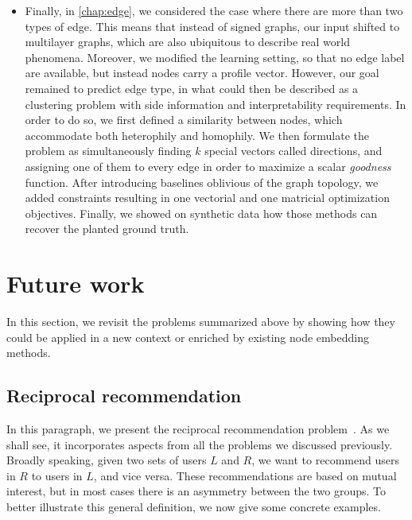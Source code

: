 \begin{itemize}
  \item Finally, in \autoref{chap:edge}, we considered the case where there are more than two types
    of edge. This means that instead of signed graphs, our input shifted to multilayer graphs, which
    are also ubiquitous to describe real world phenomena. Moreover, we modified the learning
    setting, so that no edge label are available, but instead nodes carry a profile vector. However,
    our goal remained to predict edge type, in what could then be described as a clustering problem
    with side information and interpretability requirements. In order to do so, we first defined a
    similarity between nodes, which accommodate both heterophily and homophily. We then formulate
    the problem as simultaneously finding $k$ special vectors called directions, and assigning one
    of them to every edge in order to maximize a scalar \emph{goodness} function. After introducing
    baselines oblivious of the graph topology, we added constraints resulting in one vectorial and
    one matricial optimization objectives. Finally, we showed on synthetic data how those methods
    can recover the planted ground truth.

\end{itemize}

\section{Future work}

In this section, we revisit the problems summarized above by showing how they could be applied in a
new context or enriched by existing node embedding methods.

\subsection{Reciprocal recommendation}

In this paragraph, we present the reciprocal recommendation problem~\autocite{Pizzato2013}. As we
shall see, it incorporates aspects from all the problems we discussed previously. Broadly speaking,
given two sets of users $L$ and $R$, we want to recommend users in $R$ to users in $L$, and vice
versa. These recommendations are based on mutual interest, but in most cases there is an asymmetry
between the two groups. To better illustrate this general definition, we now give some concrete
examples.

